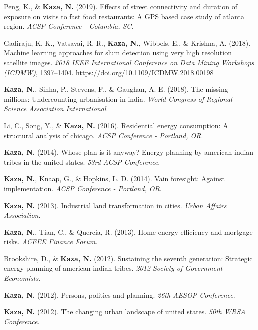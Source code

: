\documentclass[11pt,a4paper,]{awesome-cv}
\newlength{\cslhangindent}
\newenvironment{CSLReferences}[2] %
 {\begin{list}{}{%
  \setlength{\itemindent}{0pt}
  \setlength{\leftmargin}{0pt}
  \setlength{\parsep}{0pt}
  \ifodd #1
   \setlength{\leftmargin}{\cslhangindent}
   \setlength{\itemindent}{-1\cslhangindent}
  \fi
  \setlength{\itemsep}{#2\baselineskip}}}
 {\end{list}}
\begin{document}
\begin{CSLReferences}{1}{0}
Peng, K., \& \textbf{Kaza, N.} (2019). Effects of street connectivity
and duration of exposure on visits to fast food restaurants: A GPS based
case study of atlanta region. \emph{ACSP Conference - Columbia, SC}.

Gadiraju, K. K., Vatsavai, R. R., \textbf{Kaza, N.}, Wibbels, E., \&
Krishna, A. (2018). Machine learning approaches for slum detection using
very high resolution satellite images. \emph{2018 IEEE International
Conference on Data Mining Workshops (ICDMW)}, 1397--1404.
\url{https://doi.org/10.1109/ICDMW.2018.00198}

\textbf{Kaza, N.}, Sinha, P., Stevens, F., \& Gaughan, A. E. (2018). The
missing millions: Undercounting urbanisation in india. \emph{World
Congress of Regional Science Association International}.

Li, C., Song, Y., \& \textbf{Kaza, N.} (2016). Residential energy
consumption: A structural analysis of chicago. \emph{ACSP Conference -
Portland, OR}.

\textbf{Kaza, N.} (2014). Whose plan is it anyway? Energy planning by
american indian tribes in the united states. \emph{53rd ACSP
Conference}.

\textbf{Kaza, N.}, Knaap, G., \& Hopkins, L. D. (2014). Vain foresight:
Against implementation. \emph{ACSP Conference - Portland, OR}.

\textbf{Kaza, N.} (2013). Industrial land transformation in cities.
\emph{Urban Affairs Association}.

\textbf{Kaza, N.}, Tian, C., \& Quercia, R. (2013). Home energy
efficiency and mortgage risks. \emph{ACEEE Finance Forum}.

Brookshire, D., \& \textbf{Kaza, N.} (2012). Sustaining the seventh
generation: Strategic energy planning of american indian tribes.
\emph{2012 Society of Government Economists}.

\textbf{Kaza, N.} (2012). Persons, polities and planning. \emph{26th
AESOP Conference}.

\textbf{Kaza, N.} (2012). The changing urban landscape of united states.
\emph{50th WRSA Conference}.


\end{CSLReferences}
\end{document}

